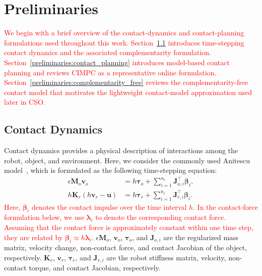 \section{Preliminaries}
\label{sec:preliminaries}

\textcolor{red}{
We begin with a brief overview of the contact-dynamics and contact-planning formulations used throughout this work.
Section~\ref{preliminaries:contact_dynamics} introduces time-stepping contact dynamics and the associated complementarity formulation.
Section~\ref{preliminaries:contact_planning} introduces model-based contact planning and reviews CIMPC as a representative online formulation.
Section~\ref{preliminaries:complementarity_free} reviews the complementarity-free contact model that motivates the lightweight contact-model approximation used later in CSO.
}

\subsection{Contact Dynamics}
\label{preliminaries:contact_dynamics}

Contact dynamics provides a physical description of interactions among the robot, object, and environment.
Here, we consider the commonly used Anitescu model~\cite{anitescu2006optimization}, which is formulated as the following time-stepping equation:
\begin{subequations}
\label{equ.quasi_dyn}
\begin{align}
 \epsilon\boldsymbol{M}_o\boldsymbol{v}_o
 &=
 h\boldsymbol{\tau}_o
 +
 \sum_{i=1}^{n_c}
 \boldsymbol{J}_{o,i}^{\top}\boldsymbol{\beta}_i,
 \label{equ.quasi_dyn_1}
 \\
 h\boldsymbol{K}_r
 \left(
 h\boldsymbol{v}_r-\boldsymbol{u}
 \right)
 &=
 h\boldsymbol{\tau}_r
 +
 \sum_{i=1}^{n_c}
 \boldsymbol{J}_{r,i}^{\top}\boldsymbol{\beta}_i.
 \label{equ.quasi_dyn_2}
\end{align}
\end{subequations}
\noindent\textcolor{red}{
Here, $\boldsymbol{\beta}_i$ denotes the contact impulse over the time interval $h$.
In the contact-force formulation below, we use $\boldsymbol{\lambda}_i$ to denote the corresponding contact force.
Assuming that the contact force is approximately constant within one time step, they are related by
$\boldsymbol{\beta}_i \approx h\boldsymbol{\lambda}_i$.
}
$\epsilon\boldsymbol{M}_o$, $\boldsymbol{v}_o$, $\boldsymbol{\tau}_o$, and $\boldsymbol{J}_{o,i}$ are the regularized mass matrix, velocity change, non-contact force, and contact Jacobian of the object, respectively.
$\boldsymbol{K}_r$, $\boldsymbol{v}_r$, $\boldsymbol{\tau}_r$, and $\boldsymbol{J}_{r,i}$ are the robot stiffness matrix, velocity, non-contact torque, and contact Jacobian, respectively.


